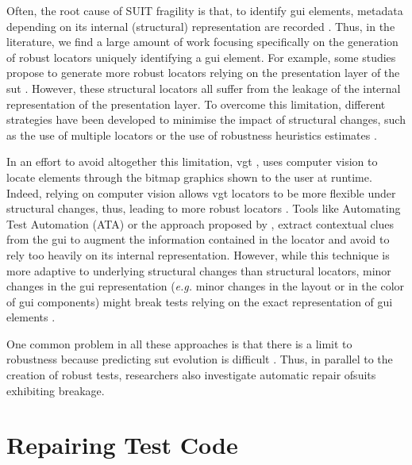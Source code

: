 Often, the root cause of SUIT fragility is that, to identify \gls{gui} elements, metadata depending on its internal (structural) representation are recorded \cite{Daniel2011, Yandrapally2014, Hammoudi2016}. Thus, in the literature, we find a large amount of work focusing specifically on the generation of robust locators uniquely identifying a \gls{gui} element. For example, some studies propose to generate more robust locators relying on the presentation  layer  of the \gls{sut} \cite{Montoto2011, Leotta2014, Leotta2015, Leotta2016, Zheng2018}. However, these structural locators all suffer from the leakage of the internal representation of the presentation layer. To overcome this limitation, different strategies have been developed to minimise the impact of structural changes, such as the use of multiple locators \cite{Leotta2015, Zheng2018, Long2020} or the use of robustness heuristics estimates \cite{Montoto2011, Leotta2014, Leotta2015, Leotta2015b}.

In an effort to avoid altogether this limitation, \gls{vgt} \cite{Bosch2014}, uses computer vision to locate elements through the bitmap graphics shown to the user at runtime. Indeed, relying on computer vision allows \gls{vgt} locators to be more flexible under structural changes, thus, leading to more robust locators \cite{Leotta2014b}. Tools like  Automating Test Automation (ATA) \cite{Thummalapenta2012, Thummalapenta2013} or the approach proposed by \textcite{Yandrapally2014}, extract contextual clues from the \gls{gui} to augment the information contained in the locator and avoid to rely too heavily on its internal representation. However, while this technique is more adaptive to underlying structural changes than structural locators, minor changes in the \gls{gui} representation (\emph{e.g.} minor changes in the layout or in the color of \gls{gui} components) might break tests relying on the exact representation of \gls{gui} elements \cite{Aldalur2017, Alegroth2018}.

One common problem in all these approaches is that there is a limit to robustness because predicting \gls{sut} evolution is difficult \cite{Kirinuki2019}. Thus, in parallel to the creation of robust tests, researchers also investigate automatic repair of\gls{suit}s exhibiting breakage.

\section{Repairing Test Code}
\label{sec:related-repair}

